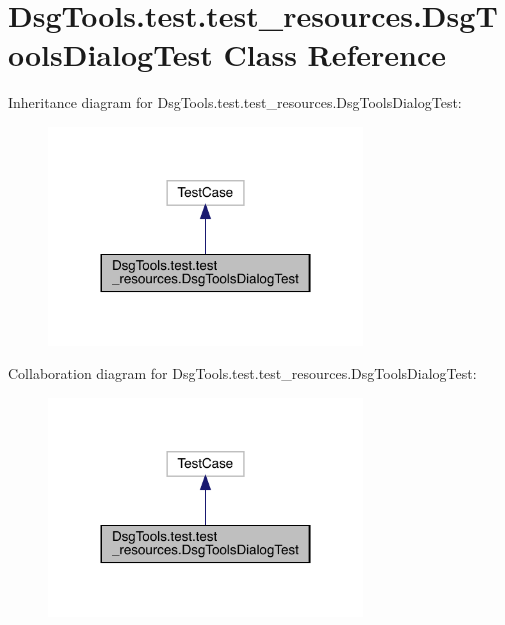 \hypertarget{class_dsg_tools_1_1test_1_1test__resources_1_1_dsg_tools_dialog_test}{}\section{Dsg\+Tools.\+test.\+test\+\_\+resources.\+Dsg\+Tools\+Dialog\+Test Class Reference}
\label{class_dsg_tools_1_1test_1_1test__resources_1_1_dsg_tools_dialog_test}


Inheritance diagram for Dsg\+Tools.\+test.\+test\+\_\+resources.\+Dsg\+Tools\+Dialog\+Test\+:
\nopagebreak
\begin{figure}[H]
\begin{center}
\leavevmode
\includegraphics[width=236pt]{class_dsg_tools_1_1test_1_1test__resources_1_1_dsg_tools_dialog_test__inherit__graph}
\end{center}
\end{figure}


Collaboration diagram for Dsg\+Tools.\+test.\+test\+\_\+resources.\+Dsg\+Tools\+Dialog\+Test\+:
\nopagebreak
\begin{figure}[H]
\begin{center}
\leavevmode
\includegraphics[width=236pt]{class_dsg_tools_1_1test_1_1test__resources_1_1_dsg_tools_dialog_test__coll__graph}
\end{center}
\end{figure}
